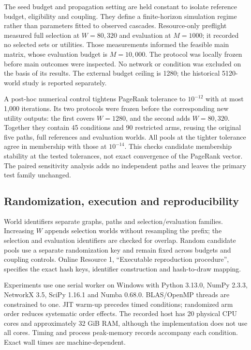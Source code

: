 \documentclass[smallextended]{svjour3}
\begin{document}
The seed budget and propagation setting are held constant to isolate reference budget, eligibility and coupling. They define a finite-horizon simulation regime rather than parameters fitted to observed cascades. Resource-only preflight measured full selection at $W=80,320$ and evaluation at $M=1000$; it recorded no selected sets or utilities. Those measurements informed the feasible main matrix, whose evaluation budget is $M=10,000$. The protocol was locally frozen before main outcomes were inspected. No network or condition was excluded on the basis of its results. The external budget ceiling is 1280; the historical 5120-world study is reported separately.

A post-hoc numerical control tightens PageRank tolerance to $10^{-12}$ with at most 1,000 iterations. Its two protocols were frozen before the corresponding new utility outputs: the first covers $W=1280$, and the second adds $W=80,320$. Together they contain 45 conditions and 90 restricted arms, reusing the original five paths, full references and evaluation worlds. All pools at the tighter tolerance agree in membership with those at $10^{-14}$. This checks candidate membership stability at the tested tolerances, not exact convergence of the PageRank vector. The paired sensitivity analysis adds no independent paths and leaves the primary test family unchanged.

\subsection{Randomization, execution and reproducibility}
World identifiers separate graphs, paths and selection/evaluation families. Increasing $W$ appends selection worlds without resampling the prefix; the selection and evaluation identifiers are checked for overlap. Random candidate pools use a separate randomization key and remain fixed across budgets and coupling controls. Online Resource 1, ``Executable reproduction procedure'', specifies the exact hash keys, identifier construction and hash-to-draw mapping.

Experiments use one serial worker on Windows with Python 3.13.0, NumPy 2.3.3, NetworkX 3.5, SciPy 1.16.1 and Numba 0.68.0. BLAS/OpenMP threads are constrained to one. JIT warm-up precedes timed conditions; randomized arm order reduces systematic order effects. The recorded host has 20 physical CPU cores and approximately 32 GiB RAM, although the implementation does not use all cores. Timing and process peak-memory records accompany each condition. Exact wall times are machine-dependent.
\end{document}
